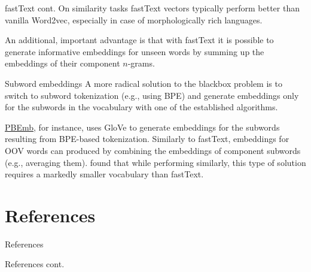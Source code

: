 \documentclass[style=upen, size=14pt]{powerdot}
\theoremstyle{definition}
\begin{document}
\begin{slide}[toc=]{fastText cont.}
  On similarity tasks fastText vectors typically perform better than vanilla
  Word2vec, especially in case of morphologically rich languages.\bigskip

  An additional, important advantage is that with fastText it is possible to
  generate informative embeddings for unseen words by summing up the embeddings
  of their component $n$-grams.
\end{slide}

\begin{slide}{Subword embeddings}
  A more radical solution to the blackbox problem is to switch to subword
  tokenization (e.g., using BPE) and generate embeddings only for the subwords
  in the vocabulary with one of the established algorithms.\bigskip

  \href{https://github.com/bheinzerling/bpemb}{PBEmb}, for instance, uses GloVe
  to generate embeddings for the subwords resulting from BPE-based tokenization.
  Similarly to fastText, embeddings for OOV words can produced by combining the
  embeddings of component subwords (e.g., averaging them).
  \cite{heinzerling2017bpemb} found that while performing similarly, this type
  of solution requires a markedly smaller vocabulary than fastText.
\end{slide}

\section{References}

\begin{slide}{References}
  
  \begin{footnotesize}
    
    \medskip

    \medskip

    \medskip

    \medskip

    \medskip
  
    
  \end{footnotesize}
\end{slide}

\begin{slide}[toc=]{References cont.}
  \begin{footnotesize}

    \medskip

    \medskip 

    \medskip
    
    \medskip
    
  \end{footnotesize}
\end{slide}
\end{document}
